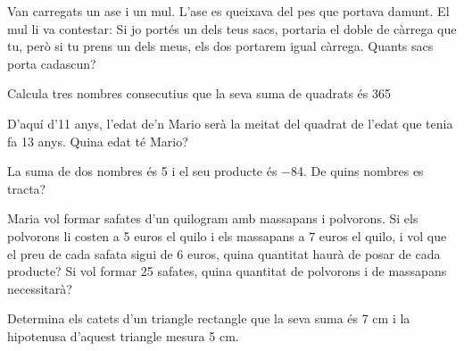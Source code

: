 \begin{activitats}
\begin{mylist}
\exer  Van carregats un ase i un mul. L'ase es queixava del pes que portava damunt. El mul li va contestar: Si jo portés un dels teus sacs, portaria el doble de càrrega que tu, però si tu prens un dels meus, els dos portarem igual càrrega. Quants sacs porta cadascun?


\exer  Calcula tres nombres consecutius que la seva suma de quadrats és 365

\exer  D'aquí d'11 anys, l'edat de'n Mario serà la meitat del quadrat de l'edat que tenia fa 13 anys. Quina edat té Mario?


\exer  La suma de dos nombres és 5 i el seu producte és $-$84. De quins nombres es tracta?

\exer  Maria vol formar safates d'un quilogram amb massapans i polvorons. Si els polvorons li costen a 5 euros el quilo i els massapans a 7 euros el quilo, i vol que el preu de cada safata sigui de 6 euros, quina quantitat haurà de posar de cada producte? Si vol formar 25 safates, quina quantitat de polvorons i de massapans necessitarà?

\exer  Determina els catets d'un triangle rectangle que la seva suma és 7 cm i la hipotenusa d'aquest triangle mesura 5 cm.


\end{mylist}
\end{activitats}
